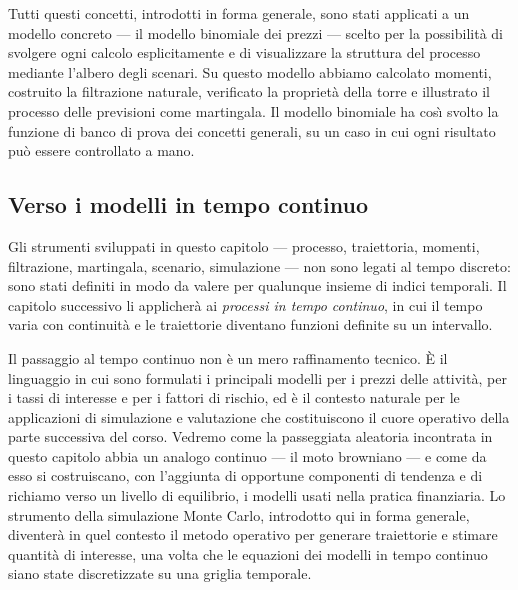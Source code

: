 \noindent
Tutti questi concetti, introdotti in forma generale, sono stati
applicati a un modello concreto --- il modello binomiale dei prezzi
--- scelto per la possibilit\`{a} di svolgere ogni calcolo
esplicitamente e di visualizzare la struttura del processo mediante
l'albero degli scenari. Su questo modello abbiamo calcolato momenti,
costruito la filtrazione naturale, verificato la propriet\`{a} della
torre e illustrato il processo delle previsioni come martingala. Il
modello binomiale ha cos\`{\i} svolto la funzione di banco di prova
dei concetti generali, su un caso in cui ogni risultato pu\`{o} essere
controllato a mano.

\subsection{Verso i modelli in tempo continuo}

\noindent
Gli strumenti sviluppati in questo capitolo --- processo, traiettoria,
momenti, filtrazione, martingala, scenario, simulazione --- non sono
legati al tempo discreto: sono stati definiti in modo da valere per
qualunque insieme di indici temporali. Il capitolo successivo li
applicher\`{a} ai \emph{processi in tempo continuo}, in cui il tempo
varia con continuit\`{a} e le traiettorie diventano funzioni definite
su un intervallo.

Il passaggio al tempo continuo non \`{e} un mero raffinamento tecnico.
\`{E} il linguaggio in cui sono formulati i principali modelli per i
prezzi delle attivit\`{a}, per i tassi di interesse e per i fattori di
rischio, ed \`{e} il contesto naturale per le applicazioni di
simulazione e valutazione che costituiscono il cuore operativo della
parte successiva del corso. Vedremo come la passeggiata aleatoria
incontrata in questo capitolo abbia un analogo continuo --- il moto
browniano --- e come da esso si costruiscano, con l'aggiunta di
opportune componenti di tendenza e di richiamo verso un livello di
equilibrio, i modelli usati nella pratica finanziaria. Lo strumento
della simulazione Monte Carlo, introdotto qui in forma generale,
diventer\`{a} in quel contesto il metodo operativo per generare
traiettorie e stimare quantit\`{a} di interesse, una volta che le
equazioni dei modelli in tempo continuo siano state discretizzate su
una griglia temporale.

